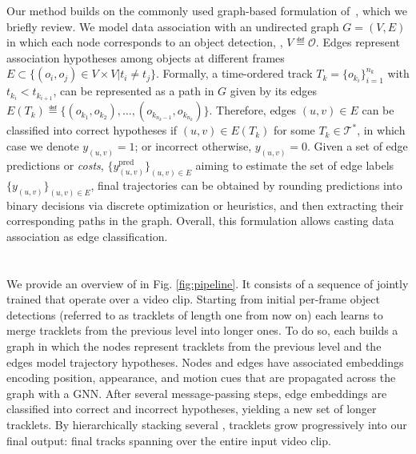 \documentclass[10pt,twocolumn,letterpaper]{article}
\begin{document}
{{ Our method builds on the commonly used graph-based formulation of~\cite{network_flows_tracking}, which we briefly review.  
We model data association with an undirected graph $G=(V, E)$ in which each node corresponds to an object detection, \ie, $V \eqdef \mathcal{O}$. Edges represent association hypotheses among objects at different frames $E\subset\{(o_i, o_j)\in V\times V | t_i \neq t_j\}$. 
Formally, a time-ordered track $T_k=\{o_{k_i}\}_{i=1}^{n_k}$ with $t_{k_i}< t_{k_{i+1}}$, can be represented as a path in $G$ given by its edges $E(T_k) \eqdef\{(o_{k_1}, o_{k_2}), \dots, (o_{k_{n_k - 1}}, o_{k_{n_k}}) \}$. 
Therefore, edges $(u, v)\in E$ can be classified into correct hypotheses if $(u, v) \in E(T_k)$ for some $T_k\in \mathcal{T}^*$, in which case we denote $y_{(u, v)}=1$; or incorrect otherwise, \ie  $y_{(u, v)} = 0$. 
Given a set of edge predictions or \textit{costs}, $\{y^{\text{pred}}_{(u, v)}\}_{(u, v)\in E}$ aiming to estimate the set of edge labels $\{y_{(u, v)}\}_{(u, v)\in E}$, final trajectories can be obtained by rounding predictions into binary decisions via discrete optimization or heuristics, and then extracting their corresponding paths in the graph. Overall, this formulation allows casting data association as edge classification. 



\section{\modelname}
\label{sec:method}

We provide an overview of \modelname in Fig. \ref{fig:pipeline}. It consists of a sequence of jointly trained \textit{\blocknameplural} that operate over a video clip.
Starting from initial per-frame object detections (referred to as tracklets of length one from now on) each \blockname learns to merge tracklets from the previous level into longer ones. 
To do so, each \blockname builds a graph in which the nodes represent tracklets from the previous level and the edges model trajectory hypotheses. 
Nodes and edges have associated embeddings encoding position, appearance, and motion cues that are propagated across the graph with a GNN. 
After several message-passing steps, edge embeddings are classified into correct and incorrect hypotheses, yielding a new set of longer tracklets. By hierarchically stacking several \blocknameplural, tracklets grow progressively into our final output: final tracks spanning over the entire  input video clip.


}}
\end{document}
